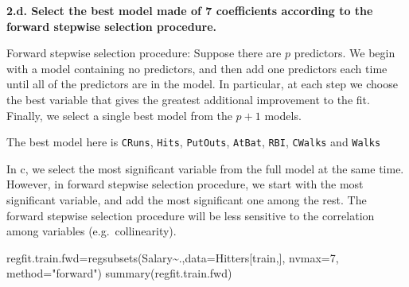\documentclass[
]{article}
\newenvironment{Shaded}{\begin{snugshade}}{\end{snugshade}}
\newcommand{\AttributeTok}[1]{\textcolor[rgb]{0.77,0.63,0.00}{#1}}
\newcommand{\DecValTok}[1]{\textcolor[rgb]{0.00,0.00,0.81}{#1}}
\newcommand{\FunctionTok}[1]{\textcolor[rgb]{0.00,0.00,0.00}{#1}}
\newcommand{\NormalTok}[1]{#1}
\newcommand{\OtherTok}[1]{\textcolor[rgb]{0.56,0.35,0.01}{#1}}
\newcommand{\SpecialCharTok}[1]{\textcolor[rgb]{0.00,0.00,0.00}{#1}}
\newcommand{\StringTok}[1]{\textcolor[rgb]{0.31,0.60,0.02}{#1}}
\begin{document}
\textbf{2.d. Select the best model made of 7 coefficients according to
the forward stepwise selection procedure.}

Forward stepwise selection procedure: Suppose there are \(p\)
predictors. We begin with a model containing no predictors, and then add
one predictors each time until all of the predictors are in the model.
In particular, at each step we choose the best variable that gives the
greatest additional improvement to the fit. Finally, we select a single
best model from the \(p+1\) models.

The best model here is \texttt{CRuns}, \texttt{Hits}, \texttt{PutOuts},
\texttt{AtBat}, \texttt{RBI}, \texttt{CWalks} and \texttt{Walks}

In c, we select the most significant variable from the full model at the
same time. However, in forward stepwise selection procedure, we start
with the most significant variable, and add the most significant one
among the rest. The forward stepwise selection procedure will be less
sensitive to the correlation among variables (e.g.~collinearity).

\begin{Shaded}
\begin{Highlighting}[]
\NormalTok{regfit.train.fwd}\OtherTok{=}\FunctionTok{regsubsets}\NormalTok{(Salary}\SpecialCharTok{\textasciitilde{}}\NormalTok{.,}\AttributeTok{data=}\NormalTok{Hitters[train,], }\AttributeTok{nvmax=}\DecValTok{7}\NormalTok{, }\AttributeTok{method=}\StringTok{"forward"}\NormalTok{)}
\FunctionTok{summary}\NormalTok{(regfit.train.fwd)}
\end{Highlighting}
\end{Shaded}
\end{document}
